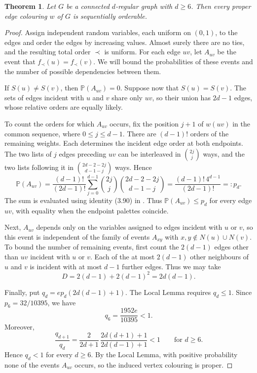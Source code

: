 \documentclass[a4paper,12pt]{elsarticle}
\newtheorem{theorem}{Theorem}
\newcommand{\probP}{{\mathbb{P}}}
\begin{document}
\begin{theorem} Let $G$ be a connected $d$-regular graph with $d\geq 6$. Then every proper edge colouring $w$ of $G$ is sequentially orderable.
\end{theorem}
\begin{proof}
    Assign independent random variables, each uniform on $(0,1)$, to the edges and order the edges by increasing values. Almost surely there are no ties, and the resulting total order $\prec$ is uniform. For each edge $uv$, let $A_{uv}$ be the event that $f_{\prec}(u)=f_{\prec}(v)$. We will bound the probabilities of these events and the number of possible dependencies between them.

    If $S(u)\neq S(v)$, then $\probP(A_{uv})=0$. Suppose now that $S(u)=S(v)$. The sets of edges incident with $u$ and $v$ share only $uv$, so their union has $2d-1$ edges, whose relative orders are equally likely.

    To count the orders for which $A_{uv}$ occurs, fix the position $j+1$ of $w(uv)$ in the common sequence, where $0\leq j\leq d-1$. There are $(d-1)!$ orders of the remaining weights. Each determines the incident edge order at both endpoints. The two lists of $j$ edges preceding $uv$ can be interleaved in $\binom{2j}{j}$ ways, and the two lists following it in $\binom{2d-2-2j}{d-1-j}$ ways. Hence
    \[
        \probP(A_{uv})
        =\frac{(d-1)!}{(2d-1)!}
        \sum_{j=0}^{d-1}\binom{2j}{j}\binom{2d-2-2j}{d-1-j}
        =\frac{(d-1)!\,4^{d-1}}{(2d-1)!}
        =:p_d.
    \]
    The sum is evaluated using identity (3.90) in \cite{Gould}. Thus $\probP(A_{uv})\leq p_d$ for every edge $uv$, with equality when the endpoint palettes coincide.

    Next, $A_{uv}$ depends only on the variables assigned to edges incident with $u$ or $v$, so this event is independent of the family of events $A_{xy}$ with $x,y\notin N(u)\cup N(v)$.
    To bound the number of remaining events, first count the $2(d-1)$ edges other than $uv$ incident with $u$ or $v$. Each of the at most $2(d-1)$ other neighbours of $u$ and $v$ is incident with at most $d-1$ further edges. Thus we may take
    \[
        D=2(d-1)+2(d-1)^2=2d(d-1).
    \]

    Finally, put $q_d=e p_d(2d(d-1)+1)$. The Local Lemma requires $q_d\leq1$. Since $p_6=32/10395$, we have
    \[
        q_6=\frac{1952e}{10395}<1.
    \]
    Moreover,
    \[
        \frac{q_{d+1}}{q_d}
        =\frac{2}{2d+1}\,
        \frac{2d(d+1)+1}{2d(d-1)+1}<1
        \qquad\text{for }d\geq6.
    \]
    Hence $q_d<1$ for every $d\geq6$. By the Local Lemma, with positive probability none of the events $A_{uv}$ occurs, so the induced vertex colouring is proper.
\end{proof}
\end{document}
